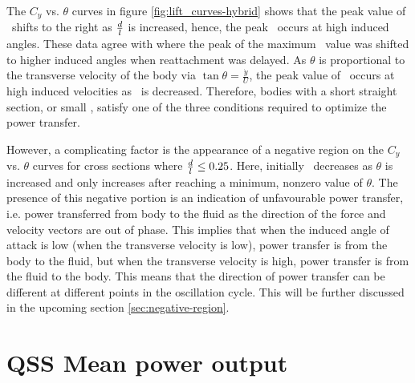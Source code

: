  

The $C_y$ vs. $\theta$ curves in figure \ref{fig:lift_curves-hybrid} shows that the peak value of \cy\ shifts to the right as $\frac{d}{l}$ is increased, hence, the peak \cy\ occurs at high induced angles.  These data agree with \citet{Luo1994} where the peak of the maximum \cy\ value was shifted to higher induced angles when reattachment was delayed. As $\theta$ is proportional to the transverse velocity of the body via $\tan{\theta}=\frac{\dot{y}}{U}$, the peak value of \cy\ occurs at high induced velocities as \ratio\ is decreased. Therefore, bodies with a short straight section, or small \ratio, satisfy one of the three conditions required to optimize the power transfer.

However, a complicating factor is the appearance of a negative region on the $C_y$ vs. $\theta$ curves for cross sections where $\frac{d}{l}\leq0.25$. Here, initially \cy\ decreases as $\theta$ is increased and only increases after reaching a minimum, nonzero value of $\theta$. The presence of this negative portion is an indication of unfavourable power transfer, i.e. power transferred from body to the fluid as the direction of the force and velocity vectors are out of phase. This implies that when the induced angle of attack is low (when the transverse velocity is low), power transfer is from the body to the fluid, but when the transverse velocity is high, power transfer is from the fluid to the body. This means that the direction of power transfer can be different at different points in the oscillation cycle. This will be further discussed in the upcoming section \ref{sec:negative-region}.

 
 
 \section{QSS Mean power output}
 \label{sec:cross-sec-qss-mean power}
 
 
 
